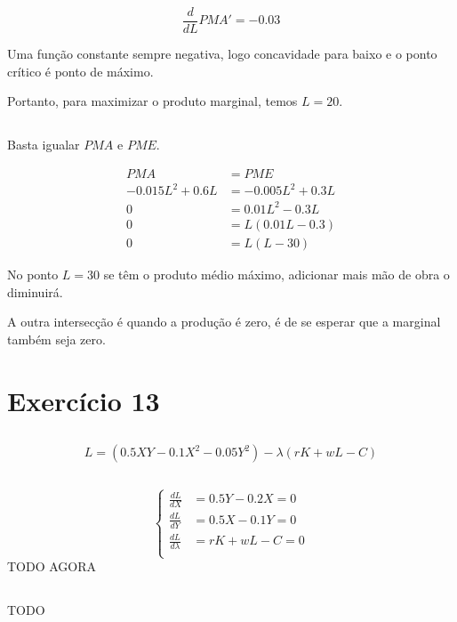 \documentclass{article}
\begin{document}
\[
	\frac{d}{dL}PMA' = - 0.03
\]

Uma função constante sempre negativa, logo concavidade para baixo e o ponto
crítico é ponto de máximo.

Portanto, para maximizar o produto marginal, temos \(L = 20\).

\subsection{}

Basta igualar \(PMA\) e \(PME\).

\[
	\begin{aligned}
		PMA              & = PME              \\
		-0.015L^2 + 0.6L & = -0.005L^2 + 0.3L \\
		0                & = 0.01L^2 - 0.3L   \\
		0                & = L(0.01L - 0.3)   \\
		0                & = L(L - 30)
	\end{aligned}
\]

No ponto \(L=30\) se têm o produto médio máximo, adicionar mais mão de obra o
diminuirá.

A outra intersecção é quando a produção é zero, é de se esperar que a marginal
também seja zero.

\section{Exercício 13}

\subsection{}
\[
	L = (0.5XY - 0.1X^2 - 0.05Y^2) - \lambda(rK +wL - C)
\]

\subsection{}
\[
	\left\{
	\begin{aligned}
		\frac{dL}{dX}       & = 0.5Y - 0.2X = 0 \\
		\frac{dL}{dY}       & = 0.5X - 0.1Y = 0 \\
		\frac{dL}{d\lambda} & = rK + wL - C = 0 \\
	\end{aligned}
	\right.
\]
TODO AGORA

\subsection{}
TODO
\end{document}
